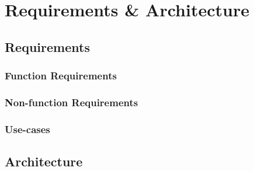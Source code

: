 \chapter{Requirements \& Architecture}
\section{Requirements}

\subsection{Function Requirements}

\subsection{Non-function Requirements}

\subsection{Use-cases}

\section{Architecture}

